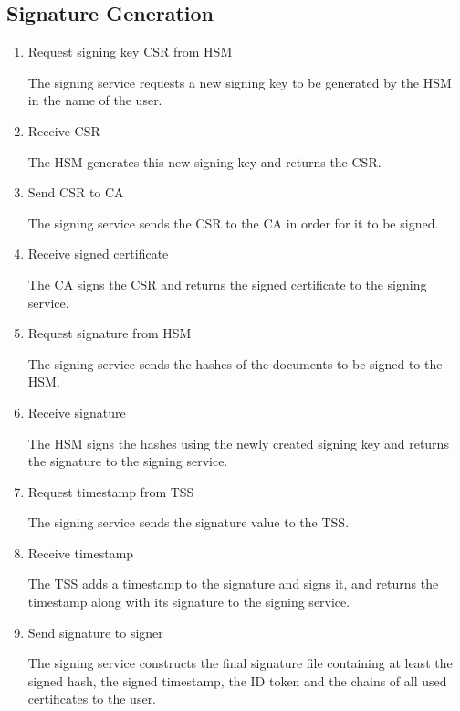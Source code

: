 	
\subsection{Signature Generation}
\begin{enumerate}[resume]
	\item Request signing key \gls{CSR} from \gls{HSM}
	
	The signing service requests a new signing key to be generated by the \gls{HSM} in the name of the user.
	
	\item Receive \gls{CSR}
	
	The HSM generates this new signing key and returns the \acrfull{CSR}.
	
	\item Send \gls{CSR} to \gls{CA}
	
	The signing service sends the \gls{CSR} to the \gls{CA} in order for it to be signed.
	
	\item Receive signed certificate
	
	The \gls{CA} signs the \gls{CSR} and returns the signed certificate to the signing service.
	
	\item Request signature from \gls{HSM}
	
	The signing service sends the hashes of the documents to be signed to the \gls{HSM}.
	
	\item Receive signature
	
	The \gls{HSM} signs the hashes using the newly created signing key and returns the signature to the signing service.
	
	\item Request timestamp from \gls{TSS}
	
	The signing service sends the signature value to the \gls{TSS}.
	
	\item Receive timestamp
	
	The \gls{TSS} adds a timestamp to the signature and signs it,
	and returns the timestamp along with its signature to the signing service.

	\item Send signature to signer
	
	The signing service constructs the final signature file containing at least the signed hash,
	the signed timestamp, the ID token and the chains of all used certificates to the user.
\end{enumerate}
	
